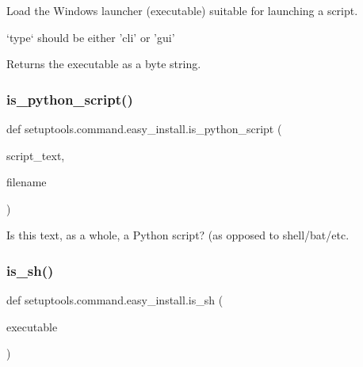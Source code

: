 \begin{DoxyVerb}Load the Windows launcher (executable) suitable for launching a script.

`type` should be either 'cli' or 'gui'

Returns the executable as a byte string.
\end{DoxyVerb}
 \mbox{\label{namespacesetuptools_1_1command_1_1easy__install_a6dd384c4f3471ae5d2480ccef58bb8e9}} 
\subsubsection{\texorpdfstring{is\+\_\+python\+\_\+script()}{is\_python\_script()}}
{\footnotesize\ttfamily def setuptools.\+command.\+easy\+\_\+install.\+is\+\_\+python\+\_\+script (\begin{DoxyParamCaption}\item[{}]{script\+\_\+text,  }\item[{}]{filename }\end{DoxyParamCaption})}

\begin{DoxyVerb}Is this text, as a whole, a Python script? (as opposed to shell/bat/etc.
\end{DoxyVerb}
 \mbox{\label{namespacesetuptools_1_1command_1_1easy__install_a8eb329bf287009f97a5804721548658d}} 
\subsubsection{\texorpdfstring{is\+\_\+sh()}{is\_sh()}}
{\footnotesize\ttfamily def setuptools.\+command.\+easy\+\_\+install.\+is\+\_\+sh (\begin{DoxyParamCaption}\item[{}]{executable }\end{DoxyParamCaption})}

